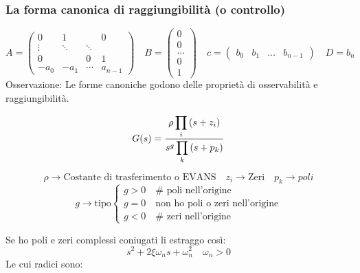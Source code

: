 	\subsubsection{La forma canonica di raggiungibilità (o controllo)}
	\[A=\left(\begin{array}{cccc}
		0 & 1 & &0 \\
		\vdots&\ddots  &\ddots&  \\
		0& &  0& 1 \\
		-a_0&-a_1 & \cdots & a_{n-1}
	\end{array}\right) \quad B=\left(\begin{array}{c}
		0 \\
		0 \\
		\dots\\
		0 \\
		1
	\end{array}\right) \quad c=\left(\begin{array}{llll}
		b_0 & b_1 & \ldots & b_{n-1}
	\end{array}\right) \quad D=b_n\]
	Osservazione: Le forme canoniche godono delle proprietà di osservabilità e raggiungibilità.
	\begin{figure}[H]
		\begin{minipage}{.5\linewidth}
			\[G(s)=\frac{\rho \displaystyle\prod_i\left(s+z_i\right)}{s^g \displaystyle\prod_k\left(s+p_k\right)}\]
		\end{minipage}
		\begin{minipage}{.5\linewidth}
			\[\rho \to \text{Costante di trasferimento o EVANS} \quad z_i\to \text{Zeri}\quad p_k \to poli\]
			\[g\to\text{tipo}\begin{cases}
				g>0 \quad \# \text{ poli nell'origine}\\
				g = 0\quad \text{non ho poli o zeri nell'origine}\\
				g<0 \quad \# \text{ zeri nell'origine}
			\end{cases}\]
		\end{minipage}
	\end{figure}
	Se ho poli e zeri complessi coniugati li estraggo così:
	\[s^2 + 2\xi\omega_ns + \omega_n^2\quad \omega_n >0\]
	Le cui radici sono:
